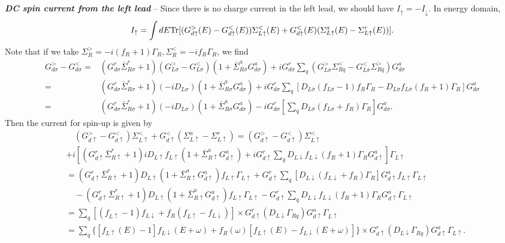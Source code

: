 \documentclass[aps,prb,superscriptaddress]{revtex4-2}
\begin{document}
{\noindent \bf{\textit{DC spin current from the left lead}}} -- Since there is no charge current in the left lead, we should have $I_\uparrow= -I_\downarrow$. In energy domain,
\begin{eqnarray}
I_\uparrow = \int dE {\rm Tr} [(G_{d\uparrow}^>(E)-G_{d\uparrow}^<(E))\Sigma^<_{L\uparrow}(E) +G_{d\uparrow}^<(E) (\Sigma_{L\uparrow}^a(E) -\Sigma_{L\uparrow}^r(E))]. \label{up1}
\end{eqnarray}
Note that if we take  $\Sigma_R^{>}=-i(f_R+1)\Gamma_R, \Sigma_R^{<}=-if_R\Gamma_R$, we find
\begin{equation}
\begin{split}
G^>_{d\sigma} - G^<_{d\sigma} =&(G^r_{d\sigma}{\bar \Sigma}_{R\sigma}^r+1) (G^>_{L\sigma}-G^<_{L\sigma}) (1+{\bar \Sigma}_{R\sigma}^a
G^a_{d\sigma}) +i G^r_{d\sigma} \sum_q (G^>_{L\bar\sigma}\Sigma_{Rq}^< - G^<_{L\bar\sigma}\Sigma_{Rq}^>) G^a_{d\sigma} \\
=& (G^r_{d\sigma}{\bar \Sigma}_{R\sigma}^r+1) (-iD_{L\sigma}) (1+{\bar \Sigma}_{R\sigma}^a
G^a_{d\sigma}) +i G^r_{d\sigma} \sum_q [D_{L\bar\sigma}(f_{L\bar\sigma}-1)f_{R}\Gamma_R - D_{L\bar\sigma}f_{L\bar\sigma}(f_R+1)\Gamma_{R}] G^a_{d\sigma} \\
=& (G^r_{d\sigma}{\bar \Sigma}_{R\sigma}^r+1) (-iD_{L\sigma}) (1+{\bar \Sigma}_{R\sigma}^a
G^a_{d\sigma})  - i G^r_{d\sigma}[ \sum_q D_{L\bar\sigma}(f_{L\bar\sigma}+f_{R})\Gamma_R ] G^a_{d\sigma}.
\end{split}
\end{equation}
Then the current for spin-up is given by
\begin{equation}
\begin{split}
&\quad(G_{d\uparrow}^>-G_{d\uparrow}^< )\Sigma_{L\uparrow}^< +G_{d\uparrow}^< (\Sigma_{L\uparrow}^a-\Sigma_{L\uparrow}^r) = (G_{d\uparrow}^>-G_{d\uparrow}^< )\Sigma_{L\uparrow}^< \\
&+ i[(G^r_{d\uparrow}{\bar \Sigma}_{R\uparrow}^r+1) iD_{L\uparrow}f_{L\uparrow} (1+{\bar \Sigma}_{R\uparrow}^a
G^a_{d\uparrow}) +i G^r_{d\uparrow} \sum_q D_{L\downarrow}f_{L\downarrow}(f_R+1)\Gamma_R G^a_{d\uparrow}]\Gamma_{L\uparrow} \\
&= (G^r_{d\uparrow}{\bar \Sigma}_{R\uparrow}^r+1) D_{L\uparrow} (1+{\bar \Sigma}_{R\uparrow}^a G^a_{d\uparrow})f_{L\uparrow}\Gamma_{L\uparrow} + G^r_{d\uparrow} \sum_q [D_{L\downarrow}(f_{L\downarrow}+f_{R})\Gamma_{R}] G^a_{d\uparrow} f_{L\uparrow}\Gamma_{L\uparrow} \\
&\quad - (G^r_{d\uparrow}{\bar \Sigma}_{R\uparrow}^r+1) D_{L\uparrow} (1+{\bar \Sigma}_{R\uparrow}^a G^a_{d\uparrow}) f_{L\uparrow}\Gamma_{L\uparrow} - G^r_{d\uparrow} \sum_q D_{L\downarrow}f_{L\downarrow}(f_R+1)\Gamma_R G^a_{d\uparrow} \Gamma_{L\uparrow} \\
& =\sum_q [(f_{L\uparrow}-1)f_{L\downarrow} + f_R(f_{L\uparrow}-f_{L\downarrow})] \times G^r_{d\uparrow} (D_{L\downarrow} \Gamma_{Rq}) G^a_{d\uparrow}\Gamma_{L\uparrow} \\
& =\sum_q \{[f_{L\uparrow}(E)-1]f_{L\downarrow}(E+\omega) + f_R(\omega)[f_{L\uparrow}(E)-f_{L\downarrow}(E+\omega)]\} \times G^r_{d\uparrow} (D_{L\downarrow} \Gamma_{Rq}) G^a_{d\uparrow}\Gamma_{L\uparrow}.
\end{split}
\end{equation}
\end{document}
